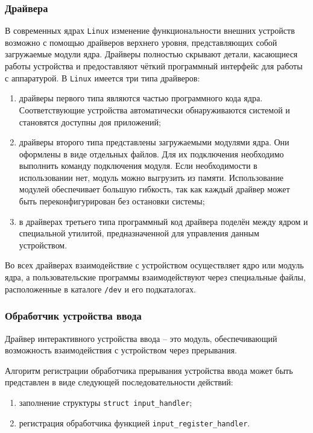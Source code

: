 \subsubsection{Драйвера}

В современных ядрах \texttt{Linux} изменение функциональности внешних устройств возможно с помощью драйверов верхнего уровня, представляющих собой загружаемые модули ядра. Драйверы полностью скрывают детали, касающиеся работы устройства и предоставляют чёткий программный интерфейс для работы с аппаратурой. В \texttt{Linux} имеется три типа драйверов:

\begin{enumerate}
	\item драйверы первого типа являются частью программного кода ядра. Соответствующие устройства автоматически обнаруживаются системой и
	становятся доступны доя приложений;
	
	\item драйверы второго типа представлены загружаемыми модулями ядра. Они	оформлены в виде отдельных файлов. Для их подключения необходимо выполнить команду подключения модуля. Если необходимости в
	использовании нет, модуль можно выгрузить из памяти. Использование
	модулей обеспечивает большую гибкость, так как каждый драйвер может быть переконфигурирован без остановки системы;
	
	\item в драйверах третьего типа программный код драйвера поделён между ядром и специальной утилитой, предназначенной для управления данным устройством.
\end{enumerate}

Во всех драйверах взаимодействие с устройством осуществляет ядро или
модуль ядра, а пользовательские программы взаимодействуют через специальные файлы, расположенные в каталоге \texttt{/dev} и его подкаталогах.

\subsubsection{Обработчик устройства ввода}

Драйвер интерактивного устройства ввода -- это модуль, обеспечивающий возможность взаимодействия с устройством через прерывания.

Алгоритм регистрации обработчика прерывания устройства ввода \cite{docs} может быть представлен в виде следующей последовательности действий: 
\begin{enumerate}
	\item заполнение структуры \texttt{struct input\_handler};
	\item регистрация обработчика функцией \texttt{input\_register\_handler}. 
\end{enumerate}

